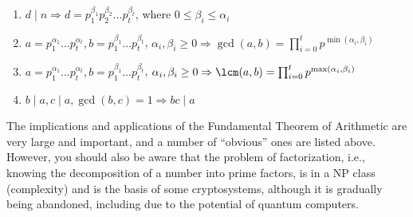 \documentclass[../lecture-notes.tex]{subfiles}
\begin{document}


    

\begin{corollary}
    \hfill

    \begin{enumerate}
        \item $d \mid n \Rightarrow d = p_{1}^{\beta_1}p_{2}^{\beta_2} \dots p_{t}^{\beta_t}$, where $0 \leq \beta_i \leq \alpha_i$
        \item $a = p_{1}^{\alpha_1} \dots p_{t}^{\alpha_t}, b = p_{1}^{\beta_1} \dots p_{t}^{\beta_t}$, $\alpha_i, \beta_i \geq 0 \Rightarrow \gcd(a, b) = \prod_{i=0}^{t}p^{\min(\alpha_i, \beta_i)}$
        \item $a = p_{1}^{\alpha_1} \dots p_{t}^{\alpha_t}, b = p_{1}^{\beta_1} \dots p_{t}^{\beta_t}$, $\alpha_i, \beta_i \geq 0 \Rightarrow \lcm(a, b) = \prod_{i=0}^{t}p^{\max(\alpha_i, \beta_i)}$
        \item $b \mid a, c \mid a, \gcd(b, c) = 1 \Rightarrow bc \mid a$
    \end{enumerate}
\end{corollary}

The implications and applications of the Fundamental Theorem of Arithmetic are very large and important, and a number of “obvious” ones are listed above.
However, you should also be aware that the problem of factorization, i.e., knowing the decomposition of a number into prime factors, is in a NP class (complexity) and is the basis of some cryptosystems, although it is gradually being abandoned, including due to the potential of quantum computers.
\end{document}
